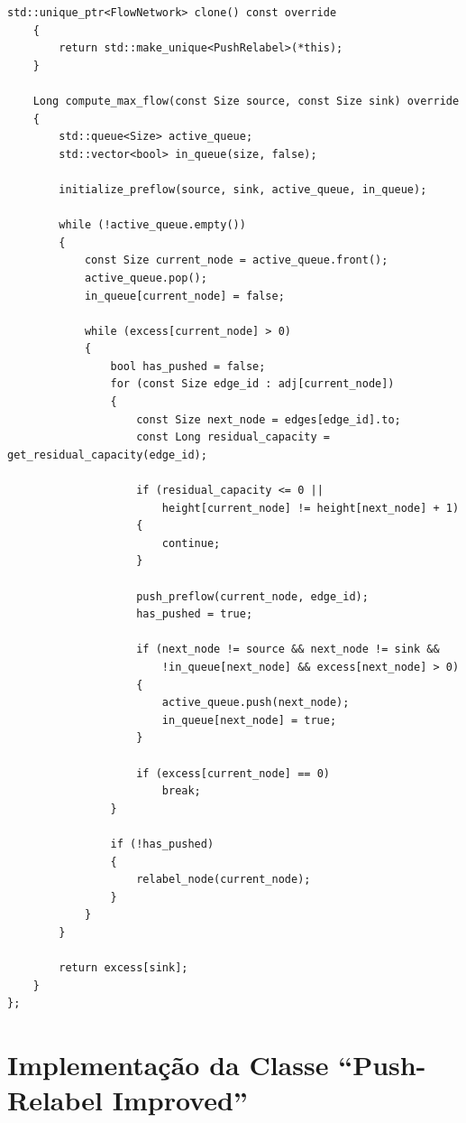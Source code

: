 \documentclass[12pt,a4paper]{article}
\begin{document}
\begin{lstlisting}[caption={Implementação em C++ da classe \lstinline{PushRelabel}, baseada em pré-fluxos topológicos e política de processamento em fila (FIFO).}, label={lst:push_relabel}]
	std::unique_ptr<FlowNetwork> clone() const override
	{
		return std::make_unique<PushRelabel>(*this);
	}

	Long compute_max_flow(const Size source, const Size sink) override
	{
		std::queue<Size> active_queue;
		std::vector<bool> in_queue(size, false);

		initialize_preflow(source, sink, active_queue, in_queue);

		while (!active_queue.empty())
		{
			const Size current_node = active_queue.front();
			active_queue.pop();
			in_queue[current_node] = false;

			while (excess[current_node] > 0)
			{
				bool has_pushed = false;
				for (const Size edge_id : adj[current_node])
				{
					const Size next_node = edges[edge_id].to;
					const Long residual_capacity = get_residual_capacity(edge_id);

					if (residual_capacity <= 0 ||
					    height[current_node] != height[next_node] + 1)
					{
						continue;
					}

					push_preflow(current_node, edge_id);
					has_pushed = true;

					if (next_node != source && next_node != sink &&
					    !in_queue[next_node] && excess[next_node] > 0)
					{
						active_queue.push(next_node);
						in_queue[next_node] = true;
					}

					if (excess[current_node] == 0)
						break;
				}

				if (!has_pushed)
				{
					relabel_node(current_node);
				}
			}
		}

		return excess[sink];
	}
};
\end{lstlisting}

\newpage\section{Implementação da Classe ``Push-Relabel Improved''}
\label{ap:push_relabel_improved}
\end{document}
